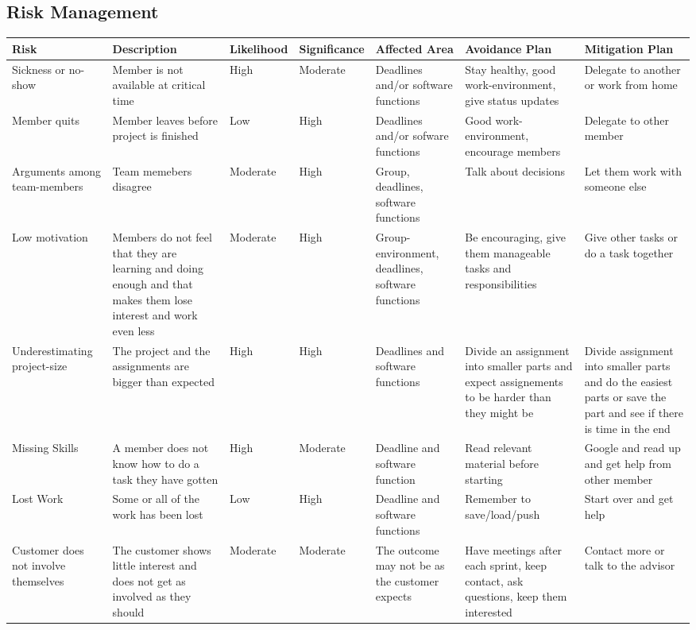 \documentclass{report}
\begin{document}
\begin{landscape}

\newpage
\section{Risk Management} \label{sec:risk_management}

\begin{longtable}{| p{3cm} | p{4cm}| l | l | p{3cm} | p{4cm}| p{4cm} |} \hline
Risk & Description & Likelihood & Significance & Affected Area & Avoidance Plan & Mitigation Plan \\ \hline
Sickness or no-show & Member is not available at critical time & High & Moderate & Deadlines and/or software functions & Stay healthy, good work-environment, give status updates & Delegate to another or work from home \\ \hline
Member quits & Member leaves before project is finished & Low & High & Deadlines and/or sofware functions & Good work-environment, encourage members & Delegate to other member \\ \hline
Arguments among team-members & Team memebers disagree & Moderate & High & Group, deadlines, software functions & Talk about decisions & Let them work with someone else \\ \hline
Low motivation & Members do not feel that they are learning and doing enough and that makes them lose interest and work even less & Moderate & High & Group-environment, deadlines, software functions & Be encouraging, give them manageable tasks and responsibilities & Give other tasks or do a task together\\ \hline
Underestimating project-size & The project and the assignments are bigger than expected & High & High & Deadlines and software functions & Divide an assignment into smaller parts and expect assignements to be harder than they might be & Divide assignment into smaller parts and do the easiest parts or save the part and see if there is time in the end \\ \hline
Missing Skills & A member does not know how to do a task they have gotten & High & Moderate & Deadline and software function & Read relevant material before starting & Google and read up and get help from other member \\ \hline
Lost Work & Some or all of the work has been lost & Low & High & Deadline and software functions & Remember to save/load/push  & Start over and get help \\ \hline
Customer does not involve themselves & The customer shows little interest and does not get as involved as they should & Moderate & Moderate & The outcome may not be as the customer expects & Have meetings after each sprint, keep contact, ask questions, keep them interested & Contact more or talk to the advisor \\ \hline

\end{longtable}
\end{landscape}
\end{document}
